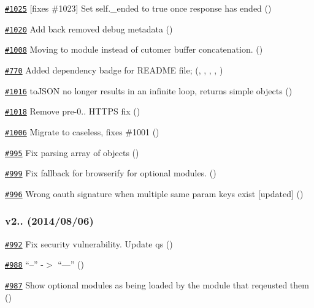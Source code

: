 \begin{DoxyItemize}
\item \href{https://github.com/request/request/pull/1025}{\tt \#1025} \mbox{[}fixes \#1023\mbox{]} Set self.\+\_\+ended to true once response has ended ()
\item \href{https://github.com/request/request/pull/1020}{\tt \#1020} Add back removed debug metadata ()
\item \href{https://github.com/request/request/pull/1008}{\tt \#1008} Moving to module instead of cutomer buffer concatenation. ()
\item \href{https://github.com/request/request/pull/770}{\tt \#770} Added dependency badge for R\+E\+A\+D\+ME file; (, , , , )
\item \href{https://github.com/request/request/pull/1016}{\tt \#1016} to\+J\+S\+ON no longer results in an infinite loop, returns simple objects ()
\item \href{https://github.com/request/request/pull/1018}{\tt \#1018} Remove pre-\/0.. H\+T\+T\+PS fix ()
\item \href{https://github.com/request/request/pull/1006}{\tt \#1006} Migrate to caseless, fixes \#1001 ()
\item \href{https://github.com/request/request/pull/995}{\tt \#995} Fix parsing array of objects ()
\item \href{https://github.com/request/request/pull/999}{\tt \#999} Fix fallback for browserify for optional modules. ()
\item \href{https://github.com/request/request/pull/996}{\tt \#996} Wrong oauth signature when multiple same param keys exist \mbox{[}updated\mbox{]} ()
\end{DoxyItemize}

\subsubsection*{v2.. (2014/08/06)}


\begin{DoxyItemize}
\item \href{https://github.com/request/request/pull/992}{\tt \#992} Fix security vulnerability. Update qs ()
\item \href{https://github.com/request/request/pull/988}{\tt \#988} “--” -\/$>$ “—” ()
\item \href{https://github.com/request/request/pull/987}{\tt \#987} Show optional modules as being loaded by the module that reqeusted them ()
\end{DoxyItemize}

